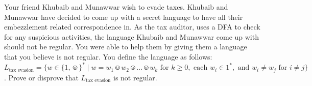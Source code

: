 \documentclass[a4paper]{exam}
\begin{document}
\begin{questions}



    \question[10] Your friend Khubaib and Munawwar wish to evade taxes. Khubaib and Munawwar have decided to come up with a secret language to have all their embezzlement related correspondence in. As the tax auditor, uses a DFA to check for any suspicious activities, the language Khubaib and Munawwar come up with should not be regular. You were able to help them by giving them a language that you believe is not regular. You define the language as follows: $L_{\text{tax evasion}} = \{ w \in \{1, \smiley \}^* \mid w = w_1\smiley w_2\smiley \dots \smiley w_k \text{ for } k \geq 0, \text{ each } w_i \in 1^*, \text{ and } w_i \neq w_j \text{ for } i \neq j \}$. Prove or disprove that $L_{\text{tax evasion}}$ is not regular.

    \begin{solution}
    \end{solution}
  
  
\end{questions}
\end{document}
